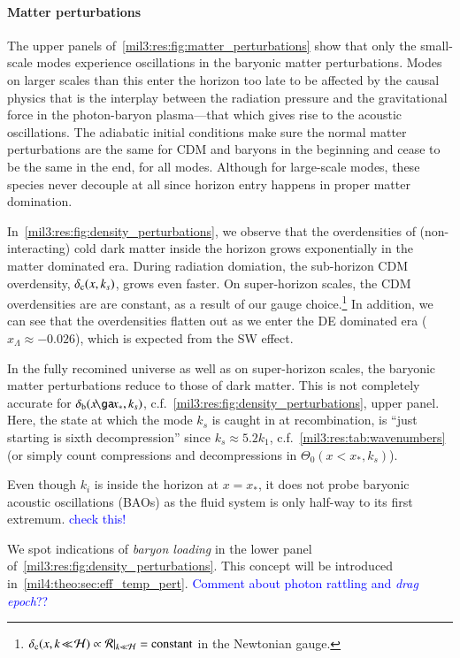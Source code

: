 \paragraph{Matter perturbations}
The upper panels of~\cref{mil3:res:fig:matter_perturbations} show that only the small-scale modes experience oscillations in the baryonic matter perturbations. Modes on larger scales than this enter the horizon too late to be affected by the causal physics that is the interplay between the radiation pressure and the gravitational force in the photon-baryon plasma---that which gives rise to the acoustic oscillations. The adiabatic initial conditions make sure the normal matter perturbations are the same for CDM and baryons in the beginning and cease to be the same in the end, for all modes. Although for large-scale modes, these species never  decouple at all since horizon entry happens in proper matter domination. 

In~\cref{mil3:res:fig:density_perturbations}, we observe that the overdensities of (non-interacting) cold dark matter inside the horizon grows exponentially in the matter dominated era. During radiation domiation, the sub-horizon CDM overdensity, $\delta_\mathrm{c}(x, k_s)$, grows even faster. On super-horizon scales, the CDM overdensities are are constant, as a result of our gauge choice.\footnote{$\delta_\mathrm{c}(x, k\!\ll\! \mathcal{H}) \propto \mathcal{R}|_{k\ll \mathcal{H}} = \text{constant}$ in the Newtonian gauge.} In addition, we can see that the overdensities flatten out as we enter the DE dominated era ($x_\Lambda\approx -0.026$), which is expected from the SW effect.

In the fully recomined universe as well as on super-horizon scales, the baryonic matter perturbations reduce to those of dark matter. This is not completely accurate for $\delta\ped{b}(x\!\ga\!x_*,k_s)$, c.f.~\cref{mil3:res:fig:density_perturbations}, upper panel. Here, the state at which the mode $k_s$ is caught in at recombination, is ``just starting is sixth decompression'' since $k_s\approx 5.2 k_1$, c.f.~\cref{mil3:res:tab:wavenumbers} (or simply count compressions and decompressions in $\Theta_0(x\!<\!x_*, k_s)$). 

Even though $k_i$ is inside the horizon at $x=x_*$, it does not probe baryonic acoustic oscillations (BAOs) as the fluid system is only half-way to its first extremum. \textcolor{blue}{check this!}

We spot indications of \textit{baryon loading} in the lower panel of~\cref{mil3:res:fig:density_perturbations}. This concept will be introduced in~\cref{mil4:theo:sec:eff_temp_pert}. \textcolor{blue}{Comment about photon rattling and \textit{drag epoch}??}



